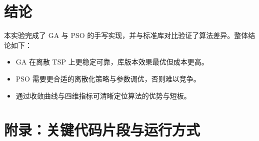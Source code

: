 \documentclass[runningheads]{ctexart}
\begin{document}
\section{结论}
本实验完成了 GA 与 PSO 的手写实现，并与标准库对比验证了算法差异。整体结论如下：
\begin{itemize}
	\item GA 在离散 TSP 上更稳定可靠，库版本效果最优但成本更高。
	\item PSO 需要更合适的离散化策略与参数调优，否则难以竞争。
	\item 通过收敛曲线与四维指标可清晰定位算法的优势与短板。
\end{itemize}

\section*{附录：关键代码片段与运行方式}
\end{document}
